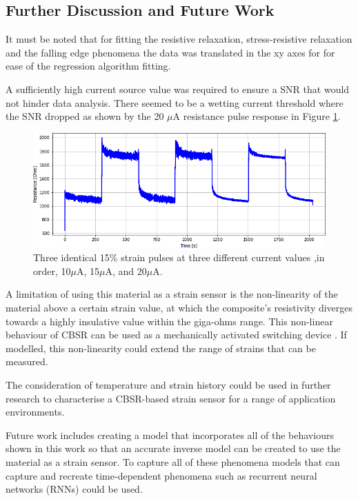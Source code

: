 \subsection{Further Discussion and Future Work}
It must be noted that for fitting the resistive relaxation, stress-resistive relaxation and the falling edge phenomena the data was translated in the xy axes for for ease of the regression algorithm fitting.

A sufficiently high current source value was required to ensure a SNR that would not hinder data analysis. There seemed to be a wetting current threshold where the SNR dropped as shown by the 20 $\mu$A resistance pulse response in Figure \ref{fig:multi_current}.
\begin{figure}[H]
	\centering
	\includegraphics[width=0.7\linewidth]{Figures/test_multicurrent_2_7-5_v3_res_only.png}
	\caption{Three identical 15\% strain pulses at three different current values ,in order, 10$\mu$A, 15$\mu$A, and 20$\mu$A.}
	\label{fig:multi_current}
\end{figure}

A limitation of using this material as a strain sensor is the non-linearity of the material above a certain strain value, at which the composite's resistivity diverges towards a highly insulative value within the giga-ohms range. This non-linear behaviour of CBSR can be used as a mechanically activated switching device \cite{Henke2018}. If modelled, this non-linearity could extend the range of strains that can be measured.

The consideration of temperature and strain history \cite{Fung1993} could be used in further research to characterise a CBSR-based strain sensor for a range of application environments.

Future work includes creating a model that incorporates all of the behaviours shown in this work so that an accurate inverse model can be created to use the material as a strain sensor. To capture all of these phenomena models that can capture and recreate time-dependent phenomena such as recurrent neural networks (RNNs) could be used.

